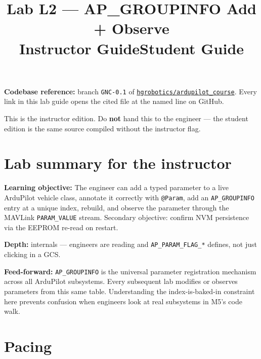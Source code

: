 \documentclass[a4paper,11pt,twoside]{article}
\title{Lab L2 --- AP\_GROUPINFO Add + Observe\\
  \large \ifinstructor Instructor Guide\else Student Guide\fi}
\author{\copyrightline}
\date{}
\begin{document}
\maketitle

\noindent\textbf{Codebase reference:} branch \texttt{GNC-0.1} of \href{\repourl}{\nolinkurl{hgrobotics/ardupilot_course}}. Every link in this lab guide opens the cited file at the named line on GitHub.

\bigskip

\ifinstructor

\begin{tcolorbox}[colback=red!5!white,colframe=red!40!black,title=Instructor edition]
This is the instructor edition. Do \textbf{not} hand this to the engineer --- the student edition is the same source compiled without the instructor flag.
\end{tcolorbox}

\section*{Lab summary for the instructor}

\textbf{Learning objective:} The engineer can add a typed parameter to a live ArduPilot vehicle class, annotate it correctly with \texttt{@Param}, add an \texttt{AP\_GROUPINFO} entry at a unique index, rebuild, and observe the parameter through the MAVLink \texttt{PARAM\_VALUE} stream. Secondary objective: confirm NVM persistence via the EEPROM re-read on restart.

\textbf{Depth:} internals --- engineers are reading  and \texttt{AP\_PARAM\_FLAG\_*} defines, not just clicking in a GCS.

\textbf{Feed-forward:} \texttt{AP\_GROUPINFO} is the universal parameter registration mechanism across all ArduPilot subsystems. Every subsequent lab modifies or observes parameters from this same table. Understanding the index-is-baked-in constraint here prevents confusion when engineers look at real subsystems in M5's code walk.

\section*{Pacing}
\end{document}
